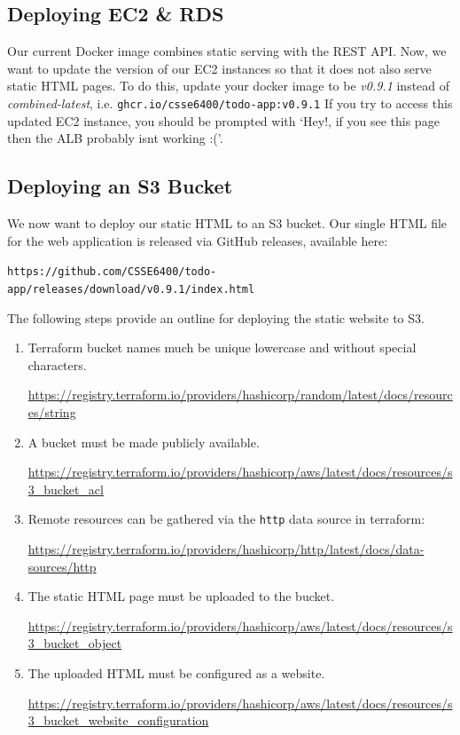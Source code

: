 \documentclass{csse4400}
\begin{document}
\subsection{Deploying EC2 \& RDS}
Our current Docker image combines static serving with the REST API.
Now, we want to update the version of our EC2 instances so that it does not also serve static HTML pages.
To do this,
update your docker image to be \textsl{v0.9.1} instead of \textsl{combined-latest},
i.e. \texttt{ghcr.io/csse6400/todo-app:v0.9.1}
If you try to access this updated EC2 instance, 
you should be prompted with `Hey!, if you see this page then the ALB probably isnt working :('.

\subsection{Deploying an S3 Bucket}
We now want to deploy our static HTML to an S3 bucket.
Our single HTML file for the web application is released via GitHub releases, available here:

\noindent\texttt{https://github.com/CSSE6400/todo-app/releases/download/v0.9.1/index.html}

\noindent The following steps provide an outline for deploying the static website to S3.

\begin{enumerate}
  \item Terraform bucket names much be unique lowercase and without special characters.
  
  \url{https://registry.terraform.io/providers/hashicorp/random/latest/docs/resources/string}

  \item A bucket must be made publicly available.
  
  \url{https://registry.terraform.io/providers/hashicorp/aws/latest/docs/resources/s3_bucket_acl}

  \item Remote resources can be gathered via the \texttt{http} data source in terraform: 
  
  \url{https://registry.terraform.io/providers/hashicorp/http/latest/docs/data-sources/http}

  \item The static HTML page must be uploaded to the bucket.
  
  \url{https://registry.terraform.io/providers/hashicorp/aws/latest/docs/resources/s3_bucket_object}

  \item The uploaded HTML must be configured as a website.
  
  \url{https://registry.terraform.io/providers/hashicorp/aws/latest/docs/resources/s3_bucket_website_configuration}
\end{enumerate}
\end{document}

